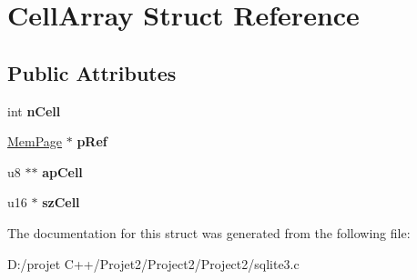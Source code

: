 \hypertarget{struct_cell_array}{}\section{Cell\+Array Struct Reference}
\label{struct_cell_array}
\subsection*{Public Attributes}
\begin{DoxyCompactItemize}
\item 
\mbox{\label{struct_cell_array_a8fe33d4e52945d03ca96b4593995813d}} 
int {\bfseries n\+Cell}
\item 
\mbox{\label{struct_cell_array_a14046c4bbf3090696f4e6909e94fa44d}} 
\mbox{\hyperlink{struct_mem_page}{Mem\+Page}} $\ast$ {\bfseries p\+Ref}
\item 
\mbox{\label{struct_cell_array_a70f7b19795ffe0c921484857721135a2}} 
u8 $\ast$$\ast$ {\bfseries ap\+Cell}
\item 
\mbox{\label{struct_cell_array_a66bb706ff8b01135461c0a9f0b72c47b}} 
u16 $\ast$ {\bfseries sz\+Cell}
\end{DoxyCompactItemize}


The documentation for this struct was generated from the following file\+:\begin{DoxyCompactItemize}
\item 
D\+:/projet C++/\+Projet2/\+Project2/\+Project2/sqlite3.\+c\end{DoxyCompactItemize}
